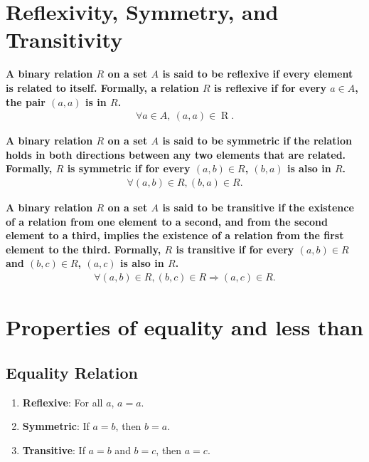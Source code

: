 \documentclass{report}
\begin{document}
    \section{\LARGE Reflexivity, Symmetry, and Transitivity}
    \smallbreak \noindent
    \begin{definition}
    \textbf{A binary relation \( R \) on a set \( A \) is said to be \textbf{reflexive} if every element is related to itself. Formally, a relation \( R \) is reflexive if for every \( a \in A \), the pair \( (a, a) \) is in \( R \).} 
      \begin{align*}
        \forall a \in A,\ (a,a) \in \mathrel{R}
      .\end{align*}
    \end{definition}
    \smallbreak \noindent
    \begin{definition}
    \textbf{A binary relation \( R \) on a set \( A \) is said to be \textbf{symmetric} if the relation holds in both directions between any two elements that are related. Formally, \( R \) is symmetric if for every \( (a, b) \in R \), \( (b, a) \) is also in \( R \).} 
      \begin{align*}
        \forall (a, b) \in R, (b, a) \in R
      .\end{align*}
    \end{definition}
    \smallbreak \noindent
    \begin{definition}
    \textbf{A binary relation \( R \) on a set \( A \) is said to be \textbf{transitive} if the existence of a relation from one element to a second, and from the second element to a third, implies the existence of a relation from the first element to the third. Formally, \( R \) is transitive if for every \( (a, b) \in R \) and \( (b, c) \in R \), \( (a, c) \) is also in \( R \).} 
      \begin{align*}
        \forall (a, b) \in R, (b, c) \in R \Rightarrow (a, c) \in R
      .\end{align*}
    \end{definition}

    \pagebreak \bigbreak \noindent 
    \section{\LARGE Properties of equality and less than}
    \bigbreak \noindent 
    \subsection{Equality Relation}
    \begin{enumerate}
        \item \textbf{Reflexive}: For all \(a\), \(a = a\).
        \item \textbf{Symmetric}: If \(a = b\), then \(b = a\).
        \item \textbf{Transitive}: If \(a = b\) and \(b = c\), then \(a = c\).
    \end{enumerate}
\end{document}
